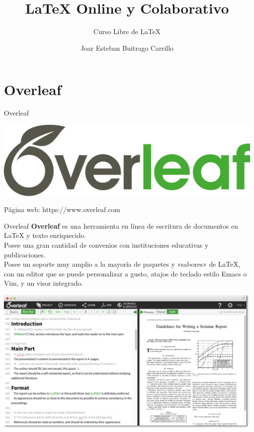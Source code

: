 \documentclass[12pt,aspectratio=43]{beamer}
\title{{\lmr\LaTeX} Online y Colaborativo}
\subtitle{Curso Libre de {\lmr\LaTeX}}
\author{Joar Esteban Buitrago Carrillo}
\institute{Universidad Nacional de Colombia}
\date{}
\makeatletter
\newcommand{\lmr}{\fontfamily{lmr}\selectfont}
\newcommand{\ifratio}[2]{
	\ifthenelse
	{\lengthtest{\beamer@paperwidth=16cm} \AND \lengthtest{\beamer@paperheight=9cm}}
	{#1}
	{#2} }
\makeatother
\begin{document}
\begin{frame}[plain]
\titlepage
\end{frame}

{
\begin{frame}
\ifratio
	{}
	{}
\end{frame}
}

\section{Overleaf}
\begin{frame}{Overleaf}{}
\begin{center}
	\includegraphics[width=0.7\linewidth]{Overleaf_Logo}
\end{center}

Página web: https://www.overleaf.com
\end{frame}

\begin{frame}{Overleaf}{}
\alert{\bf Overleaf} es una herramienta en línea de escritura de documentos en {\lmr\LaTeX} y texto enriquecido.\pause\\[1em]

Posee una gran cantidad de convenios con instituciones educativas y publicaciones.\pause\\[1em]

Posee un soporte muy amplio a la mayoría de paquetes y «sabores» de {\lmr\LaTeX}, con un editor que se puede personalizar a gusto, atajos de teclado estilo Emacs o Vim, y un visor integrado.
\end{frame}

\begin{frame}[plain]{}{}
\includegraphics[width=\linewidth]{Overleaf_Screen}
\end{frame}
\end{document}

